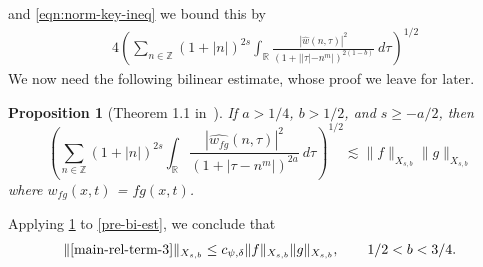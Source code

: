 \documentclass[12pt,reqno]{amsart}
\numberwithin{equation}{section}  %
\newcommand{\rr}{\mathbb{R}}
\newcommand{\zz}{\mathbb{Z}}
\newcommand{\wh}{\widehat}
\newtheorem{proposition}[theorem]{Proposition}
\begin{document}
and \eqref{eqn:norm-key-ineq} we bound this by
\begin{equation}
  \label{pre-bi-est}
  \begin{split}
		& 4 \left( \sum_{n \in 
		\zz} \left (1 + |n| \right )^{2s} \int_\rr
		\frac{|\wh{w}(n, \tau) |^2}{(1+ |  |\tau| - 
    n^{m}|)^{2(1-b)}} 
		 \ d \tau 
		\right)^{1/2}
\end{split}
\end{equation}
%
%
%
%
%
%
We now need the following bilinear estimate, whose proof we leave for later.
%
%
%
%
%
%
%
%
\begin{proposition}[Theorem 1.1 in~\cite{Farah:2009uq}]
\label{prop:bilinear-est}
	If $a > 1/4$, $b > 1/2$, and $s \ge -a/2$, 
  then 
	\begin{equation}
		\left( \sum_{n \in \zz} \left (1 + |n| \right )^{2s} \int_\rr
		\frac{|\wh{w_{fg}}(n, \tau) |^2}{\left (1+ |\tau - 
    n^{m}| \right )^{2a}} 
		 \ d \tau 
		\right)^{1/2}
		\lesssim \|f\|_{X_{s,b}} \|g\|_{X_{s,b}}
	\end{equation}
	where $w_{fg}(x,t)$ = $fg (x,t)$.
%
%
%
%
\end{proposition}
%
Applying \cref{prop:bilinear-est} to \eqref{pre-bi-est}, we conclude that
%
%
%
%
\begin{equation}
	\label{main-int2-est}
	\begin{split}
		\|\eqref{main-rel-term-3}\|_{X_{s,b}} \le c_{\psi, \delta}\|f\|_{X_{s,b}}
    \|g\|_{X_{s,b}}, \qquad 1/2 < b < 3/4.
	\end{split}
\end{equation}
%
%
%
%
%
%
%
%
%
%
%
\end{document}
